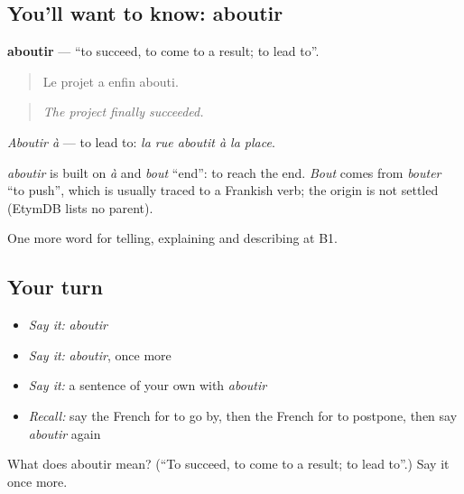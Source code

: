 \subsection*{You'll want to know: aboutir}
\textbf{aboutir} — \textquotedblleft{}to succeed, to come to a result; to lead to\textquotedblright{}.

\begin{quote}
Le projet a enfin abouti.
\end{quote}

\begin{quote}
\emph{The project finally succeeded.}
\end{quote}

\emph{Aboutir à} — to lead to: \emph{la rue aboutit à la place}.

\begin{cousinweb}
\emph{aboutir} is built on \emph{à} and \emph{bout} \textquotedblleft{}end\textquotedblright{}: to reach the end. \emph{Bout} comes from \emph{bouter} \textquotedblleft{}to push\textquotedblright{}, which is usually traced to a Frankish verb; the origin is not settled (EtymDB lists no parent).
\end{cousinweb}

\begin{grammarlens}[title={What you've built}]
One more word for telling, explaining and describing at B1.
\end{grammarlens}

\subsection*{Your turn}
\begin{itemize}
\raggedright
  \item \emph{Say it:} \emph{aboutir}
  \item \emph{Say it:} \emph{aboutir}, once more
  \item \emph{Say it:} a sentence of your own with \emph{aboutir}
  \item \emph{Recall:} say the French for to go by, then the French for to postpone, then say \emph{aboutir} again
\end{itemize}

\begin{tcolorbox}[breakable,colback=teal!4,colframe=teal!35!black,title={Before you move on}]
What does aboutir mean? (\textquotedblleft{}To succeed, to come to a result; to lead to\textquotedblright{}.) Say it once more.
\end{tcolorbox}
